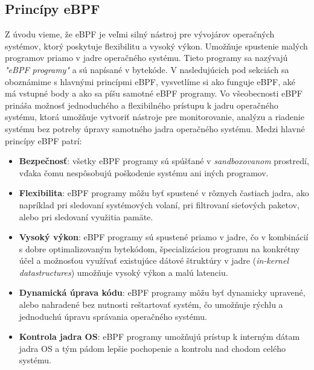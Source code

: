 \subsection{Princípy eBPF}
Z úvodu vieme, že eBPF je veľmi silný nástroj pre vývojárov operačných systémov, ktorý poskytuje flexibilitu a vysoký výkon. 
Umožňuje spustenie malých programov priamo v jadre operačného systému. Tieto programy sa nazývajú \emph{"eBPF programy"} a sú napísané v bytekóde. 
V nasledujúcich pod sekciách sa oboznámime s hlavnými princípmi eBPF, vysvetlíme si ako funguje eBPF, aké má vstupné body a ako sa píšu samotné eBPF programy. 
Vo všeobecnosti eBPF prináša možnosť jednoduchého a flexibilného prístupu k jadru operačného systému, ktorá umožňuje vytvoriť nástroje pre monitorovanie, 
analýzu a riadenie systému bez potreby úpravy samotného jadra operačného systému. 
Medzi hlavné princípy eBPF patrí: 
\begin{itemize}
    \item \textbf{Bezpečnosť}: všetky eBPF programy sú spúšťané v \emph{sandboxovanom} prostredí, vďaka čomu nespôsobujú poškodenie systému ani iných programov.
    \item \textbf{Flexibilita}: eBPF programy môžu byť spustené v rôznych častiach jadra, ako napríklad pri sledovaní systémových volaní, 
    pri filtrovaní sieťových paketov, alebo  pri sledovaní využitia pamäte.
    \item \textbf{Vysoký výkon}: eBPF programy sú spustené priamo v jadre, čo v kombinácií s dobre optimalizovaným bytekódom, 
    špecializáciou programu na konkrétny účel a možnosťou využívať existujúce dátové štruktúry v jadre (\emph{in-kernel datastructures})  
    umožňuje vysoký výkon a malú latenciu.
    \item \textbf{Dynamická úprava kódu}: eBPF programy môžu byť dynamicky upravené, alebo nahradené bez nutnosti reštartovať systém, 
    čo umožňuje rýchlu a jednoduchú úpravu správania operačného systému.
    \item \textbf{Kontrola jadra OS}: eBPF programy umožňujú prístup k interným dátam jadra OS a tým pádom lepšie pochopenie a kontrolu 
    nad chodom celého systému.~\cite{eBPF}
\end{itemize}
\pagebreak

